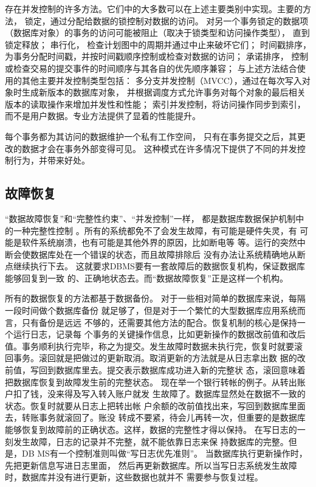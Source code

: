 存在并发控制的许多方法。它们中的大多数可以在上述主要类别中实现。主要的方法，
锁定，通过分配给数据的锁控制对数据的访问。
对另一个事务锁定的数据项（数据库对象）的事务的访问可能被阻止（取决于锁类型和访问操作类型），
直到锁定释放；
串行化， 检查计划图中的周期并通过中止来破坏它们；
时间戳排序，为事务分配时间戳，并按时间戳顺序控制或检查对数据的访问；
承诺排序， 控制或检查交易的提交事件的时间顺序与其各自的优先顺序兼容；
与上述方法结合使用的其他主要并发控制类型包括：
多分支并发控制（MVCC），通过在每次写入对象时生成新版本的数据库对象，
并根据调度方式允许事务对每个对象的最后相关版本的读取操作来增加并发性和性能；
索引并发控制，将访问操作同步到索引，而不是用户数据。专业方法提供了显着的性能提升。

每个事务都为其访问的数据维护一个私有工作空间，
只有在事务提交之后，其更改的数据才会在事务外部变得可见。
这种模式在许多情况下提供了不同的并发控制行为，并带来好处。
\subsection{故障恢复}
“数据故障恢复”和“完整性约束”、“并发控制”一样，
都是数据库数据保护机制中的一种完整性控制
。所有的系统都免不了会发生故障，有可能是硬件失灵，有
可能是软件系统崩溃，也有可能是其他外界的原因，比如断电等
等。运行的突然中断会使数据库处在一个错误的状态，而且故障排除后
没有办法让系统精确地从断点继续执行下去。
这就要求DBMS要有一套故障后的数据恢复机构，保证数据库能够回复到一致
的、正确地状态去。而“数据故障恢复”正是这样一个机构。

所有的数据恢复的方法都基于数据备份。
对于一些相对简单的数据库来说，每隔一段时间做个数据库备份
就足够了，但是对于一个繁忙的大型数据库应用系统而言，只有备份是远远
不够的，还需要其他方法的配合。恢复机制的核心是保持一个运行日志，记录每
个事务的关键操作信息，比如更新操作的数据改前值和改后值。事务顺利执行完毕，称之为提交。发生故障时数据未执行完，恢复时就要滚
回事务。滚回就是把做过的更新取消。取消更新的方法就是从日志拿出数
据的改前值，写回到数据库里去。提交表示数据库成功进入新的完整状
态，滚回意味着把数据库恢复到故障发生前的完整状态。
现在举一个银行转帐的例子。从转出账户扣了钱，没来得及写入转入账户就发
生故障了。数据库显然处在数据不一致的状态。恢复时就要从日志上把转出帐
户余额的改前值找出来，写回到数据库里面去，转账事务就滚回了。账没
转成不要紧，待会儿再转一次，但重要的是数据库能够恢复到故障前的正确状态。这样，数据的完整性才得以保持。
在写日志的一刻发生故障，日志的记录并不完整，就不能依靠日志来保
持数据库的完整。但是，DB
MS有一个控制准则叫做“写日志优先准则”。
当数据库执行更新操作时，先把更新信息写进日志里面，
然后再更新数据库。所以当写日志系统发生故障时，数据库并没有进行更新，这些数据也就并不
需要参与恢复过程。
